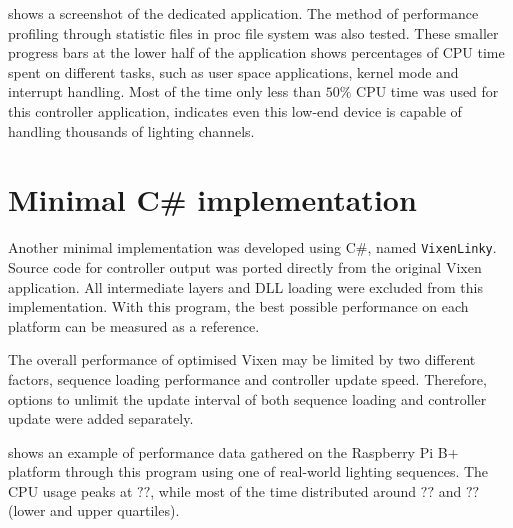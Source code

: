  shows a screenshot of the dedicated application. The method of performance profiling through statistic files in proc file system was also tested. These smaller progress bars at the lower half of the application shows percentages of CPU time spent on different tasks, such as user space applications, kernel mode and interrupt handling. Most of the time only less than $50 \%$ CPU time was used for this controller application, indicates even this low-end device is capable of handling thousands of lighting channels.

\section{Minimal C\# implementation}

Another minimal implementation was developed using C\#, named \texttt{VixenLinky}. Source code for controller output was ported directly from the original Vixen application. All intermediate layers and DLL loading were excluded from this implementation. With this program, the best possible performance on each platform can be measured as a reference.

The overall performance of optimised Vixen may be limited by two different factors, sequence loading performance and controller update speed. Therefore, options to unlimit the update interval of both sequence loading and controller update were added separately.

 shows an example of performance data gathered on the Raspberry Pi B+ platform through this program using one of real-world lighting sequences. The CPU usage peaks at $??$, while most of the time distributed around $??$ and $??$ (lower and upper quartiles).
